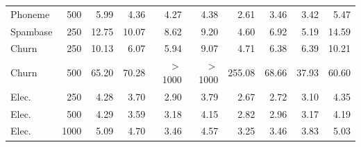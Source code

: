 \begin{tabular}{lrrrrrrrrr}
Phoneme & 500 & 5.99 & 4.36 & 4.27 & 4.38 & 2.61 & 3.46 & 3.42 & 5.47 \\
Spambase & 250 & 12.75 & 10.07 & 8.62 & 9.20 & 4.60 & 6.92 & 5.19 & 14.59 \\
Churn & 250 & 10.13 & 6.07 & 5.94 & 9.07 & 4.71 & 6.38 & 6.39 & 10.21 \\
Churn & 500 & 65.20 & 70.28 & $>$1000 & $>$1000 & 255.08 & 68.66 & 37.93 & 60.60 \\
Elec. & 250 & 4.28 & 3.70 & 2.90 & 3.79 & 2.67 & 2.72 & 3.10 & 4.35 \\
Elec. & 500 & 4.29 & 3.59 & 3.18 & 4.15 & 2.82 & 2.96 & 3.17 & 4.19 \\
Elec. & 1000 & 5.09 & 4.70 & 3.46 & 4.57 & 3.25 & 3.46 & 3.83 & 5.03 \\
\bottomrule
\end{tabular}

